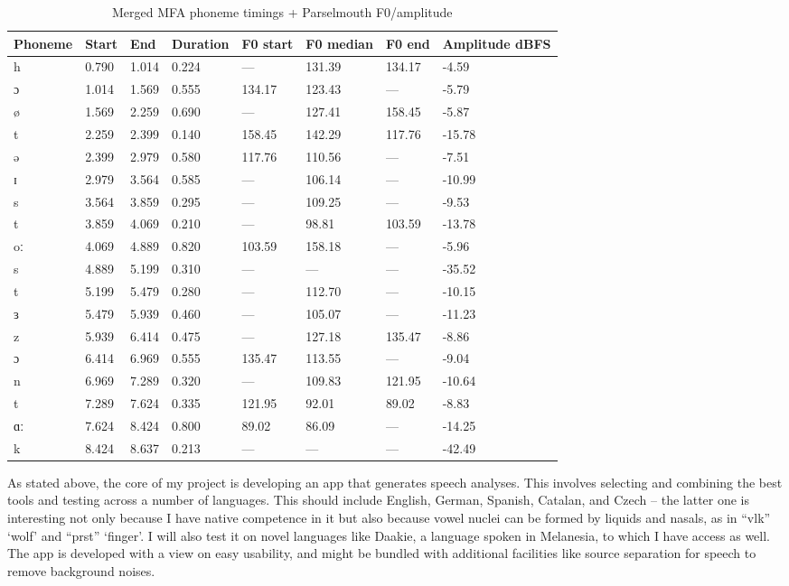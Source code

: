 \begin{table}[h]
\centering
\caption{Merged MFA phoneme timings + Parselmouth F0/amplitude}
\begin{tabular}{llllllll}
\hline
Phoneme & Start & End & Duration & F0 start & F0 median & F0 end & Amplitude dBFS \\
\hline
h   & 0.790 & 1.014 & 0.224 & --- & 131.39 & 134.17 & -4.59 \\
ɔ   & 1.014 & 1.569 & 0.555 & 134.17 & 123.43 & --- & -5.79 \\
ø   & 1.569 & 2.259 & 0.690 & --- & 127.41 & 158.45 & -5.87 \\
t   & 2.259 & 2.399 & 0.140 & 158.45 & 142.29 & 117.76 & -15.78 \\
ə   & 2.399 & 2.979 & 0.580 & 117.76 & 110.56 & --- & -7.51 \\
ɪ   & 2.979 & 3.564 & 0.585 & --- & 106.14 & --- & -10.99 \\
s   & 3.564 & 3.859 & 0.295 & --- & 109.25 & --- & -9.53 \\
t   & 3.859 & 4.069 & 0.210 & --- & 98.81 & 103.59 & -13.78 \\
oː  & 4.069 & 4.889 & 0.820 & 103.59 & 158.18 & --- & -5.96 \\
s   & 4.889 & 5.199 & 0.310 & --- & --- & --- & -35.52 \\
t   & 5.199 & 5.479 & 0.280 & --- & 112.70 & --- & -10.15 \\
ɜ   & 5.479 & 5.939 & 0.460 & --- & 105.07 & --- & -11.23 \\
z   & 5.939 & 6.414 & 0.475 & --- & 127.18 & 135.47 & -8.86 \\
ɔ   & 6.414 & 6.969 & 0.555 & 135.47 & 113.55 & --- & -9.04 \\
n   & 6.969 & 7.289 & 0.320 & --- & 109.83 & 121.95 & -10.64 \\
t   & 7.289 & 7.624 & 0.335 & 121.95 & 92.01 & 89.02 & -8.83 \\
ɑː  & 7.624 & 8.424 & 0.800 & 89.02 & 86.09 & --- & -14.25 \\
k   & 8.424 & 8.637 & 0.213 & --- & --- & --- & -42.49 \\
\hline
\end{tabular}
\end{table}

As stated above, the core of my project is developing an app that generates speech analyses. This involves selecting and combining the best tools and testing across a number of languages. This should include English, German, Spanish, Catalan, and Czech – the latter one is interesting not only because I have native competence in it but also because vowel nuclei can be formed by liquids and nasals, as in “vlk” ‘wolf’ and “prst” ‘finger’. I will also test it on novel languages like Daakie, a language spoken in Melanesia, to which I have access as well. The app is developed with a view on easy usability, and might be bundled with additional facilities like source separation for speech to remove background noises.

